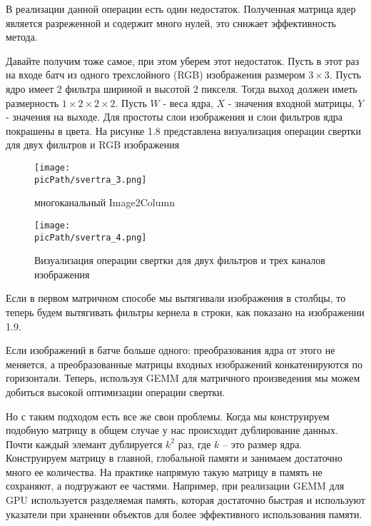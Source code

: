 \documentclass[oneside,final,12pt]{extreport}
\newcommand{\picPath}{images}
\begin{document}
В реализации данной операции есть один недостаток. Полученная матрица ядер является разреженной и содержит много нулей, это снижает эффективность метода.

Давайте получим тоже самое, при этом уберем этот недостаток. Пусть в этот раз на входе батч из одного трехслойного (RGB) изображения размером $3 \times 3$. Пусть ядро имеет 2 фильтра шириной и высотой 2 пикселя. Тогда выход должен иметь размерность $1 \times 2 \times 2 \times 2$. Пусть $W$ - веса ядра, $X$ - значения входной матрицы, $Y$ - значения на выходе. Для простоты слои изображения и слои фильтров ядра покрашены в цвета. На рисунке 1.8 представлена визуализация операции свертки для двух фильтров и RGB изображения

\begin{figure}[H]
\begin{center}
  \texttt{[image: \\picPath/svertra\_3.png]}
  \caption{многоканальный Image2Column}
  \label{fig:svertra_3}
  \end{center}
\end{figure}

\begin{figure}[H]
\begin{center}
  \texttt{[image: \\picPath/svertra\_4.png]}
  \caption{Визуализация операции свертки для двух фильтров и трех каналов изображения}
  \label{fig:svertra_4}
  \end{center}
\end{figure}
Если в первом матричном способе мы вытягивали изображения в столбцы, то теперь будем вытягивать фильтры кернела в строки, как показано на изображении 1.9.

Если изображений в батче больше одного: преобразования ядра от этого не меняется, а преобразованные матрицы входных изображений конкатенируются по горизонтали. Теперь, используя GEMM для матричного произведения мы можем добиться высокой оптимизации операции свертки. 

Но с таким подходом есть все же свои проблемы. Когда мы конструируем подобную матрицу в общем случае у нас происходит дублирование данных. Почти каждый элемант дублируется  $k^2$ раз, где $k$ – это размер ядра. Конструируем матрицу в главной, глобальной памяти и занимаем достаточно много ее количества. На практике напрямую такую матрицу в память не сохраняют, а подгружают ее частями. Например, при реализации GEMM для GPU используется разделяемая память, которая достаточно быстрая и используют указатели при хранении объектов для более эффективного использования памяти.
\end{document}
